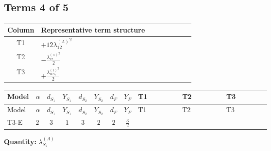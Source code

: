 \documentclass[8pt]{article}
\begin{document}
\begin{landscape}
\subsection*{Terms 4 of 5}
\begin{center}
\begin{tabular}{@{}c >{\raggedright\arraybackslash}p{0.82\linewidth}@{}}
\toprule
Column & Representative term structure \\
\midrule
T1 & \(\displaystyle +12 {\lambda_{12}^{(A)}}^2\) \\
\midrule
T2 & \(\displaystyle -\frac{{\lambda_{12}^{(\times)}}^2}{2}\) \\
\midrule
T3 & \(\displaystyle +\frac{{\lambda_{HS_2}^{(1)}}^2}{2}\) \\
\midrule
\bottomrule
\end{tabular}
\end{center}
\smallskip
\tiny
\begin{longtable}{@{}llcccccc >{\raggedright\arraybackslash}p{0.21\linewidth} >{\raggedright\arraybackslash}p{0.21\linewidth} >{\raggedright\arraybackslash}p{0.21\linewidth}@{}}
\toprule
Model & $\alpha$ & $d_{S_1}$ & $Y_{S_1}$ & $d_{S_2}$ & $Y_{S_2}$ & $d_F$ & $Y_F$ & T1 & T2 & T3 \\
\midrule
\endfirsthead
\toprule
Model & $\alpha$ & $d_{S_1}$ & $Y_{S_1}$ & $d_{S_2}$ & $Y_{S_2}$ & $d_F$ & $Y_F$ & T1 & T2 & T3 \\
\midrule
\endhead
T3-E & $2$ & $3$ & $1$ & $3$ & $2$ & $2$ & $\frac{3}{2}$ & \scriptsize\adjustbox{max width=\linewidth}{$\begin{gathered} +12 {\lambda_{12}^{(A)}}^2\end{gathered}$} & \scriptsize\adjustbox{max width=\linewidth}{$\begin{gathered} -\frac{{\lambda_{12}^{(\times)}}^2}{2}\end{gathered}$} & \scriptsize\adjustbox{max width=\linewidth}{$\begin{gathered} +\frac{{\lambda_{HS_2}^{(1)}}^2}{2}\end{gathered}$} \\
\midrule
\bottomrule
\end{longtable}
\clearpage
\noindent\textbf{Quantity: }$\lambda_{S_2}^{(A)}$\par\smallskip

\end{landscape}
\end{document}
